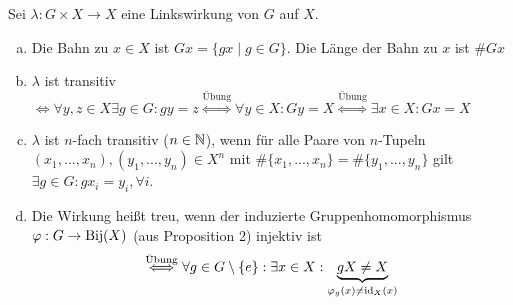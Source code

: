 \documentclass[a4paper]{report}
\begin{document}
\begin{defi}
  Sei $\lambda: G \times X \to X$ eine Linkswirkung von $G$ auf $X$.
  \begin{enumerate}[(a)]
    \item Die Bahn zu $x \in X$ ist $Gx = \{gx \mid g \in G\}$. Die Länge der Bahn zu $x$ ist $\#Gx$
    \item $\lambda$ ist transitiv $\iff \forall y, z \in X \exists g \in G : gy=z \overset{\text{Übung}}\iff \forall y \in X : Gy = X \overset{\text{Übung}}\iff \exists x \in X : Gx = X$
    \item $\lambda$ ist $n$-fach transitiv ($n \in \mathbb{N}$), wenn für alle Paare von $n$-Tupeln $(x_{1}, ..., x_{n}), (y_{1}, ..., y_{n}) \in X^{n}$ mit $\#\{x_{1}, ..., x_{n}\} = \#\{y_{1}, ..., y_{n}\}$ gilt $\exists g \in G : gx_{i} = y_{i}, \forall i$.
    \item Die Wirkung heißt treu, wenn der induzierte Gruppenhomomorphismus $\varphi: G \to \operatorname{Bij}(X)$ (aus Proposition 2) injektiv ist $$\overset{\text{Übung}} \iff \forall g \in G \setminus \{e\} : \exists x \in X : \underbrace{gX \ne X}_{\varphi_{g}(x) \ne \operatorname{id}_{X}(x)}$$
  \end{enumerate}
\end{defi}
\end{document}
